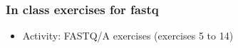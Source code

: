 \documentclass{beamer}
\begin{document}




\begin{frame}
  \frametitle{In class exercises for fastq}
  \begin{itemize}
  \item Activity: FASTQ/A exercises (exercises 5 to 14)
  \end{itemize}
\end{frame}






\end{document}
